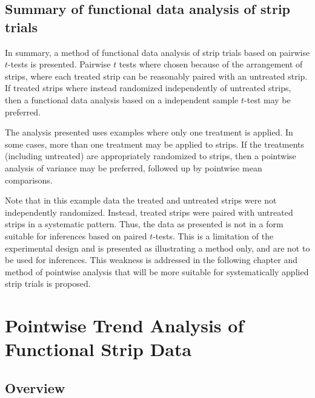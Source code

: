 \documentclass[phdcss]{SDSUThesis}
\begin{document}
\clearpage

\section{Summary of functional data analysis of strip trials}

In summary, a method of functional data analysis of strip trials based on pairwise $t$-tests is presented. Pairwise $t$ tests where chosen because of the arrangement of strips, where each treated strip can be reasonably paired with an untreated strip. If treated strips where instead randomized independently of untreated strips, then a functional data analysis based on a independent sample $t$-test may be preferred. 

The analysis presented uses examples where only one treatment is applied. In some cases, more than one treatment may be applied to strips. If the treatments (including untreated) are appropriately randomized to strips, then a pointwise analysis of variance may be preferred, followed up by pointwise mean comparisons.

Note that in this example data the treated and untreated strips were not independently randomized. Instead, treated strips were paired with untreated strips in a systematic pattern. Thus, the data as presented is not in a form suitable for inferences based on paired $t$-tests. This is a limitation of the experimental design and is presented as illustrating a method only, and are not to be used for inferences. This weakness is addressed in the following chapter and method of pointwise analysis that will be more suitable for systematically applied strip trials is proposed.

\clearpage

\chapter{Pointwise Trend Analysis of Functional Strip Data}\label{TrendAnalysisChapter}

\section{Overview}
\end{document}
